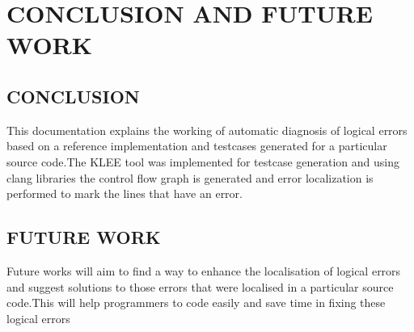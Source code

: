 \chapter{\uppercase{Conclusion and Future Work}}
\label{chap:conclusion}
\section{\uppercase{CONCLUSION}}
This documentation explains the working of automatic diagnosis of logical errors based on a reference implementation and testcases generated for a particular source code.The KLEE tool was implemented for testcase generation and using clang libraries the control flow graph is generated and error localization is performed to mark the lines that have an error.
\section{\uppercase{FUTURE WORK}}
Future works will aim to find a way to enhance the localisation of logical errors and suggest solutions to those errors that were localised in a particular source code.This will help programmers to code easily and save time in fixing these logical errors